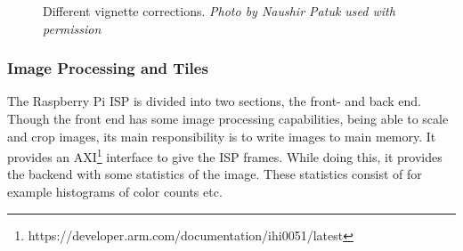 \begin{figure}[htpb]
    \centering
    \qquad

    \caption{Different vignette corrections. \textit{Photo by Naushir Patuk used with permission}}\label{fig:lens_shading}
\end{figure}

\subsubsection{Image Processing and Tiles}
The Raspberry Pi ISP is divided into two sections, the front- and back end.
Though the front end has some image processing capabilities, being able to scale
and crop images, its main responsibility is to write images to main memory.
It provides an AXI\footnote{https://developer.arm.com/documentation/ihi0051/latest}
interface to give the ISP frames. While doing this, it provides the backend
with some statistics of the image. These statistics consist of for example
histograms of color counts etc.

